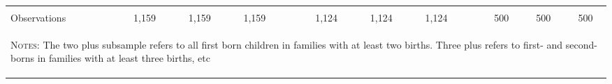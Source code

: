 \begin{landscape}
\begin{table}[htpb!]
\begin{center}
\begin{tabular}{lcccp{2mm}cccp{2mm}ccc}
\begin{footnotesize}\end{footnotesize}&\begin{footnotesize}\end{footnotesize}&\begin{footnotesize}\end{footnotesize}&\begin{footnotesize}\end{footnotesize}&\begin{footnotesize}\end{footnotesize}&\begin{footnotesize}\end{footnotesize}&\begin{footnotesize}\end{footnotesize}&\begin{footnotesize}\end{footnotesize}&\begin{footnotesize}\end{footnotesize}&\begin{footnotesize}\end{footnotesize}&\begin{footnotesize}\end{footnotesize}&\begin{footnotesize}\end{footnotesize}\\Observations&1,159&1,159&1,159&&1,124&1,124&1,124&&500&500&500\\

\midrule\multicolumn{12}{p{19.2cm}}{\begin{footnotesize}\textsc{Notes:} The two plus subsample refers to all first born children in families with at least two births.  Three plus refers to first- and second-borns in families with at least three births, etc\end{footnotesize}} \\ \bottomrule 
\end{tabular}\end{center}\end{table}\end{landscape}